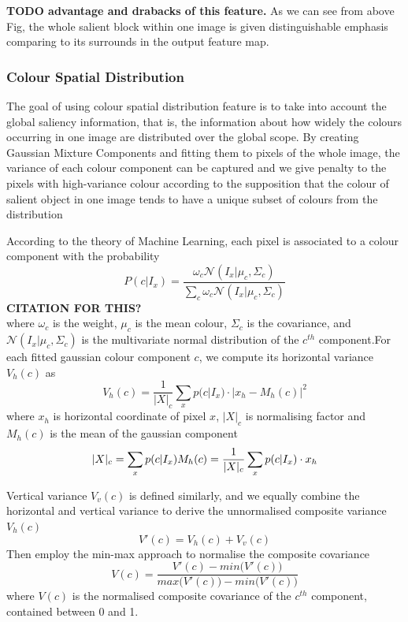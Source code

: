 \documentclass[10pt,twocolumn,letterpaper]{article}
\newcommand{\SUM}{\sum\limits}
\newcommand{\BOLD}{\textbf}
\begin{document}
\BOLD{TODO advantage and drabacks of this feature.}
As we can see from above Fig, the whole salient block within one image is given distinguishable emphasis comparing to its surrounds in the output feature map. 




\subsubsection{Colour Spatial Distribution}

The goal of using colour spatial distribution feature is to take into account the global saliency information, that is, the information about how widely the colours occurring in one image are distributed over the global scope. By creating Gaussian Mixture Components and fitting them to pixels of the whole image, the variance of each colour component can be captured and we give penalty to the pixels with high-variance colour according to the supposition that the colour of salient object in one image tends to have a unique subset of colours from the distribution

According to the theory of Machine Learning, each pixel is associated to a colour component with the probability $$
    P(c|I_x) = \frac{\omega_c\mathcal{N}(I_x|\mu_c,\Sigma_c)}{\SUM_c \omega_c \mathcal{N}(I_x|\mu_c,\Sigma_c)}$$ \BOLD{CITATION FOR THIS?}\\
where $\omega_c$ is the weight, $\mu_c$ is the mean colour, $\Sigma_c$ is the covariance, and $\mathcal N(I_x|\mu_c,\Sigma_c)$ is the multivariate normal distribution of the $c^{th}$ component.For each fitted gaussian colour component $c$, we compute its horizontal variance $V_{h}(c)$ as $$V_{h}(c) = \frac{1}{|X|_{c}} \sum_{x} p (c|I_{x}) \cdot | x_{h} - M_{h}(c) |^{2}$$ where $x_h$ is horizontal coordinate of pixel $x$, $|X|_c$ is normalising factor and $M_h (c)$ is the mean of the gaussian component $$|X|_c = \sum_x p(c|I_x)\\M_h (c) = \frac{1}{|X|_c} \sum_{x} p(c|I_x) \cdot x_h$$

Vertical variance $V_{v}(c)$ is defined similarly, and we equally combine the horizontal and vertical variance to derive the unnormalised composite variance $V_h (c)$ $$V' (c) = V_h (c) + V_v (c) $$
Then employ the min-max approach to normalise the composite covariance$$V (c) = \frac{V'(c) - min \big(V'(c)\big) }{max \big(V'(c)\big) - min \big(V'(c)\big)}$$ where $V(c)$ is the normalised composite covariance of the $c^{th}$ component, contained between 0 and 1.
\end{document}
